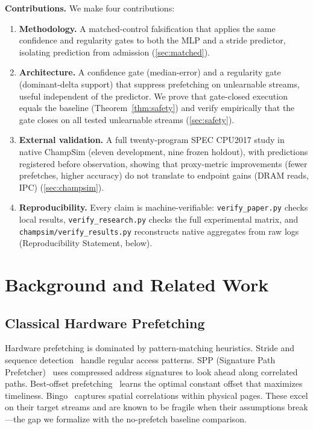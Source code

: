 \documentclass[conference]{IEEEtran}
\begin{document}
\textbf{Contributions.} We make four contributions:
\begin{enumerate}
\item \textbf{Methodology.} A matched-control falsification that applies the
same confidence and regularity gates to both the MLP and a stride predictor,
isolating prediction from admission (\cref{sec:matched}).
\item \textbf{Architecture.} A confidence gate (median-error) and a
regularity gate (dominant-delta support) that suppress prefetching on
unlearnable streams, useful independent of the predictor. We prove that
gate-closed execution equals the baseline (Theorem~\ref{thm:safety}) and
verify empirically that the gate closes on all tested unlearnable
streams (\cref{sec:safety}).
\item \textbf{External validation.} A full twenty-program SPEC CPU2017 study
in native ChampSim (eleven development, nine frozen holdout), with
predictions registered before observation, showing that proxy-metric
improvements (fewer prefetches, higher accuracy) do not translate to
endpoint gains (DRAM reads, IPC) (\cref{sec:champsim}).
\item \textbf{Reproducibility.} Every claim is machine-verifiable:
\texttt{verify\_paper.py} checks local results,
\texttt{verify\_research.py} checks the full experimental matrix, and
\texttt{champsim/verify\_results.py} reconstructs native aggregates from
raw logs (Reproducibility Statement, below).
\end{enumerate}

\section{Background and Related Work}
\label{sec:related}

\subsection{Classical Hardware Prefetching}

Hardware prefetching is dominated by pattern-matching heuristics. Stride and
sequence detection~\cite{chen1995} handle regular access patterns. SPP
(Signature Path Prefetcher)~\cite{kim2016spp} uses compressed address
signatures to look ahead along correlated paths. Best-offset
prefetching~\cite{michaud2016bop} learns the optimal constant offset that
maximizes timeliness. Bingo~\cite{bingo} captures spatial correlations
within physical pages. These excel on their target streams and are known to
be fragile when their assumptions break---the gap we formalize with the
no-prefetch baseline comparison.
\end{document}
